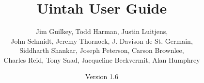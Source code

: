 \documentclass[12pt]{report}
\begin{document}
\title{Uintah User Guide}


\author{ Jim Guilkey, Todd Harman, Justin Luitjens, \\ John Schmidt, Jeremy Thornock, J. Davison de St. Germain, \\ Siddharth Shankar, Joseph Peterson, Carson Brownlee,\\ Charles Reid, Tony Saad, Jacqueline Beckvermit, Alan Humphrey}

\date{Version 1.6}

\maketitle

\tableofcontents

%

\newpage







%



\end{document}
